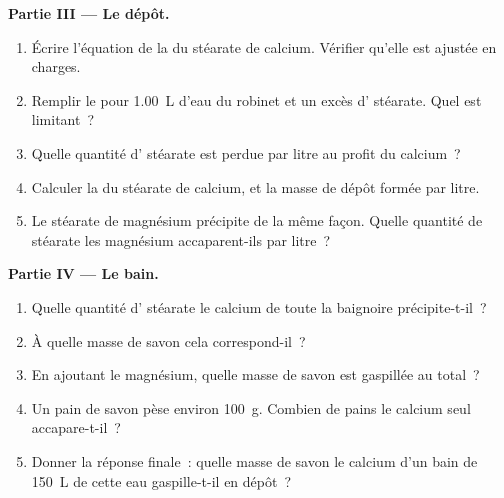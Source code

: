\begin{problem}
\medskip
\noindent\textbf{Partie III --- Le dépôt.}
\begin{enumerate}[resume]
  \item Écrire l'équation de la  du stéarate de calcium.
        Vérifier qu'elle est ajustée en charges.
  \item Remplir le  pour \qty{1.00}{L} d'eau du
        robinet et un excès d' stéarate. Quel  est
        limitant~?
  \item Quelle quantité d' stéarate est perdue par litre au profit
        du calcium~?
  \item Calculer la  du stéarate de calcium, et la masse de
        dépôt formée par litre.
  \item Le stéarate de magnésium précipite de la même façon. Quelle
        quantité de stéarate les  magnésium accaparent-ils par
        litre~?
\end{enumerate}

\medskip
\noindent\textbf{Partie IV --- Le bain.}
\begin{enumerate}[resume]
  \item Quelle quantité d' stéarate le calcium de toute la baignoire
        précipite-t-il~?
  \item À quelle masse de savon cela correspond-il~?
  \item En ajoutant le magnésium, quelle masse de savon est gaspillée au
        total~?
  \item Un pain de savon pèse environ \qty{100}{g}. Combien de pains le
        calcium seul accapare-t-il~?
  \item Donner la réponse finale~: quelle masse de savon le calcium d'un
        bain de \qty{150}{L} de cette eau gaspille-t-il en dépôt~?
\end{enumerate}
\end{problem}

